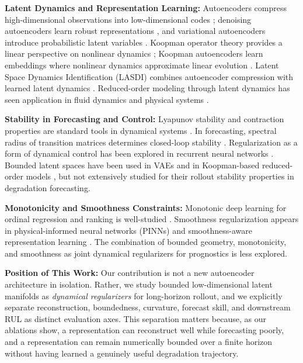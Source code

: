 \documentclass[letterpaper]{article}
\begin{document}
\textbf{Latent Dynamics and Representation Learning:} Autoencoders compress high-dimensional observations into low-dimensional codes \cite{hinton2006reducing}; denoising autoencoders learn robust representations \cite{vincent2008dae}, and variational autoencoders introduce probabilistic latent variables \cite{kingma2014autoencoding,rezende2014stochastic}. Koopman operator theory provides a linear perspective on nonlinear dynamics \cite{koopman1931hamiltonian}; Koopman autoencoders learn embeddings where nonlinear dynamics approximate linear evolution \cite{lusch2018deep,erichson2020forecasting}. Latent Space Dynamics Identification (LASDI) combines autoencoder compression with learned latent dynamics \cite{fries2022lasdi}. Reduced-order modeling through latent dynamics has seen application in fluid dynamics and physical systems \cite{pan2020physics,lee2020model}.

\textbf{Stability in Forecasting and Control:} Lyapunov stability and contraction properties are standard tools in dynamical systems \cite{ljung1999system,vidyasagar1993nonlinear}. In forecasting, spectral radius of transition matrices determines closed-loop stability \cite{hamilton1994time,brockwell2016introduction}. Regularization as a form of dynamical control has been explored in recurrent neural networks \cite{pascanu2013difficulty,jing2017tunable}. Bounded latent spaces have been used in VAEs \cite{kingma2014autoencoding} and in Koopman-based reduced-order models \cite{lusch2018deep}, but not extensively studied for their rollout stability properties in degradation forecasting.

\textbf{Monotonicity and Smoothness Constraints:} Monotonic deep learning for ordinal regression and ranking is well-studied \cite{rufibach2018monotone}. Smoothness regularization appears in physical-informed neural networks (PINNs) \cite{raissi2019physics} and smoothness-aware representation learning \cite{li2021learning}. The combination of bounded geometry, monotonicity, and smoothness as joint dynamical regularizers for prognostics is less explored.

\textbf{Position of This Work:} Our contribution is not a new autoencoder architecture in isolation. Rather, we study bounded low-dimensional latent manifolds as \emph{dynamical regularizers} for long-horizon rollout, and we explicitly separate reconstruction, boundedness, curvature, forecast skill, and downstream RUL as distinct evaluation axes. This separation matters because, as our ablations show, a representation can reconstruct well while forecasting poorly, and a representation can remain numerically bounded over a finite horizon without having learned a genuinely useful degradation trajectory.
\end{document}
